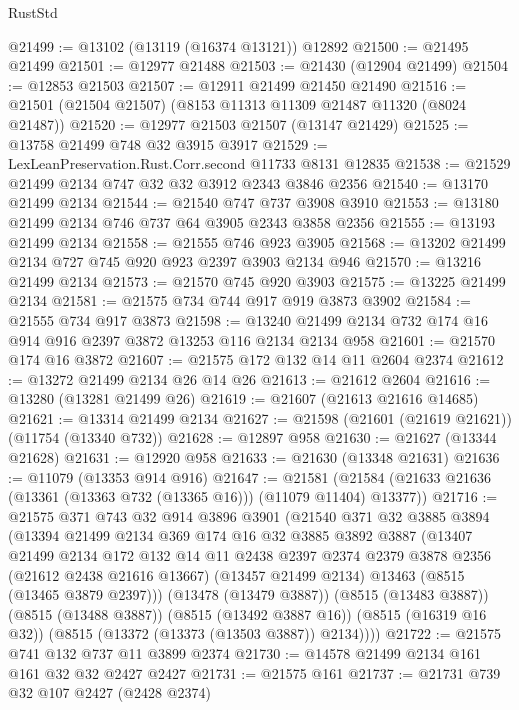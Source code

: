 \begin{lexlean}{RustStd}
\begin{coremodule}
@21499 := @13102 (@13119 (@16374 @13121)) @12892
@21500 := @21495 @21499
@21501 := @12977 @21488
@21503 := @21430 (@12904 @21499)
@21504 := @12853 @21503
@21507 := @12911 @21499 @21450 @21490
@21516 := @21501 (@21504 @21507) (@8153 @11313 @11309 @21487 @11320 (@8024 @21487))
@21520 := @12977 @21503 @21507 (@13147 @21429)
@21525 := @13758 @21499 @748 @32 @3915 @3917
@21529 := LexLeanPreservation.Rust.Corr.second @11733 @8131 @12835
@21538 := @21529 @21499 @2134 @747 @32 @32 @3912 @2343 @3846 @2356
@21540 := @13170 @21499 @2134
@21544 := @21540 @747 @737 @3908 @3910
@21553 := @13180 @21499 @2134 @746 @737 @64 @3905 @2343 @3858 @2356
@21555 := @13193 @21499 @2134
@21558 := @21555 @746 @923 @3905
@21568 := @13202 @21499 @2134 @727 @745 @920 @923 @2397 @3903 @2134 @946
@21570 := @13216 @21499 @2134
@21573 := @21570 @745 @920 @3903
@21575 := @13225 @21499 @2134
@21581 := @21575 @734 @744 @917 @919 @3873 @3902
@21584 := @21555 @734 @917 @3873
@21598 := @13240 @21499 @2134 @732 @174 @16 @914 @916 @2397 @3872 @13253 @116 @2134 @2134 @958
@21601 := @21570 @174 @16 @3872
@21607 := @21575 @172 @132 @14 @11 @2604 @2374
@21612 := @13272 @21499 @2134 @26 @14 @26
@21613 := @21612 @2604
@21616 := @13280 (@13281 @21499 @26)
@21619 := @21607 (@21613 @21616 @14685)
@21621 := @13314 @21499 @2134
@21627 := @21598 (@21601 (@21619 @21621)) (@11754 (@13340 @732))
@21628 := @12897 @958
@21630 := @21627 (@13344 @21628)
@21631 := @12920 @958
@21633 := @21630 (@13348 @21631)
@21636 := @11079 (@13353 @914 @916)
@21647 := @21581 (@21584 (@21633 @21636 (@13361 (@13363 @732 (@13365 @16))) (@11079 @11404) @13377))
@21716 := @21575
    @371
    @743
    @32
    @914
    @3896
    @3901
    (@21540
      @371
      @32
      @3885
      @3894
      (@13394
        @21499
        @2134
        @369
        @174
        @16
        @32
        @3885
        @3892
        @3887
        (@13407
          @21499
          @2134
          @172
          @132
          @14
          @11
          @2438
          @2397
          @2374
          @2379
          @3878
          @2356
          (@21612 @2438 @21616 @13667)
          (@13457 @21499 @2134)
          @13463
          (@8515 (@13465 @3879 @2397)))
        (@13478 (@13479 @3887))
        (@8515 (@13483 @3887))
        (@8515 (@13488 @3887))
        (@8515 (@13492 @3887 @16))
        (@8515 (@16319 @16 @32))
        (@8515 (@13372 (@13373 (@13503 @3887)) @2134))))
@21722 := @21575 @741 @132 @737 @11 @3899 @2374
@21730 := @14578 @21499 @2134 @161 @161 @32 @32 @2427 @2427
@21731 := @21575 @161
@21737 := @21731 @739 @32 @107 @2427 (@2428 @2374)

\end{coremodule}
\end{lexlean}
